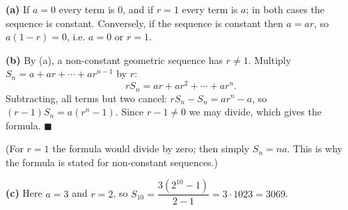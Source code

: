 \textbf{(a)} If $a=0$ every term is $0$, and if $r=1$ every term is $a$; in both cases the sequence is constant. Conversely, if the sequence is constant then $a=ar$, so $a(1-r)=0$, i.e. $a=0$ or $r=1$.

\textbf{(b)} By (a), a non-constant geometric sequence has $r\ne1$. Multiply $S_n=a+ar+\cdots+ar^{n-1}$ by $r$:
\[rS_n=ar+ar^2+\cdots+ar^{n}.\]
Subtracting, all terms but two cancel: $rS_n-S_n=ar^n-a$, so $(r-1)S_n=a\left(r^n-1\right)$. Since $r-1\ne0$ we may divide, which gives the formula. $\blacksquare$

(For $r=1$ the formula would divide by zero; then simply $S_n=na$. This is why the formula is stated for non-constant sequences.)

\textbf{(c)} Here $a=3$ and $r=2$, so $S_{10}=\dfrac{3\left(2^{10}-1\right)}{2-1}=3\cdot1023=\boxed{3069}$.
